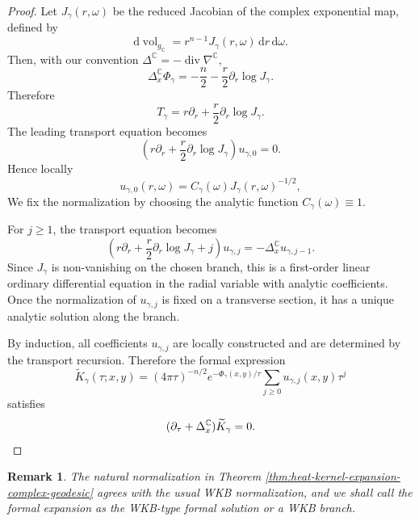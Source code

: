 \documentclass[11pt]{amsart}
\theoremstyle{plain}
\newtheorem{rmk}[thm]{Remark}
\theoremstyle{definition}
\newcommand{\C}{\mathbb{C}}
\newcommand{\dd}{\mathrm d}
\begin{document}
\begin{proof}
Let $J_\gamma(r,\omega)$ be the reduced Jacobian of the complex exponential
map, defined by
\begin{equation*}
\dd\operatorname{vol}_{g_\C}
=r^{n-1}J_\gamma(r,\omega)\,\dd r\,\dd\omega.
\end{equation*}
Then, with our convention $\Delta^{\C}=-\operatorname{div}\nabla^{\C}$,
\begin{equation*}
\Delta_x^{\C}\Phi_\gamma
=-\frac n2-\frac r2\partial_r\log J_\gamma.
\end{equation*}
Therefore
\begin{equation*}
T_\gamma=r\partial_r+\frac r2\partial_r\log J_\gamma.
\end{equation*}
The leading transport equation becomes
\begin{equation*}
\left(r\partial_r+\frac r2\partial_r\log J_\gamma
\right)u_{\gamma,0}=0.
\end{equation*}
Hence locally
\begin{equation*}
u_{\gamma,0}(r,\omega)
=C_\gamma(\omega)J_\gamma(r,\omega)^{-1/2},
\end{equation*}
We fix the normalization by choosing the analytic function $C_\gamma(\omega)\equiv1$.

For $j\ge1$, the transport equation becomes
\begin{equation*}
\left(r\partial_r+\frac r2\partial_r\log J_\gamma+j
\right)u_{\gamma,j}=-\Delta_x^{\C} u_{\gamma,j-1}.
\end{equation*}
Since $J_\gamma$ is non-vanishing on the chosen branch, this is a first-order
linear ordinary differential equation in the radial variable with analytic 
coefficients. Once the normalization of $u_{\gamma,j}$ is fixed on a transverse section, it has a unique analytic solution along the branch.

By induction, all coefficients $u_{\gamma,j}$ are locally constructed and
are determined by the transport recursion. Therefore the formal expression
\begin{equation*}
\widetilde K_\gamma(\tau;x,y)
=(4\pi\tau)^{-n/2}e^{-\Phi_\gamma(x,y)/\tau}
\sum_{j\ge0}u_{\gamma,j}(x,y)\tau^j
\end{equation*}
satisfies
\[
(\partial_\tau+\Delta_x^{\C})\widetilde K_\gamma=0.\qedhere
\]
\end{proof}



\begin{rmk}
The natural normalization in Theorem \ref{thm:heat-kernel-expansion-complex-geodesic} agrees with the usual WKB normalization, and we shall call the formal expansion as the WKB-type formal solution or a WKB branch.    
\end{rmk}
\end{document}
